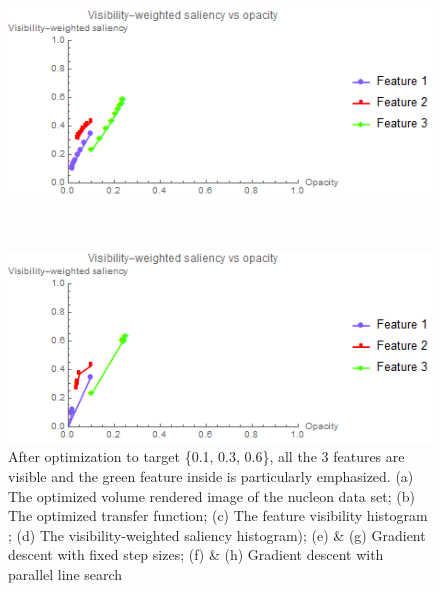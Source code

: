 \begin{figure}
	\begin{minipage}{.49\textwidth}
		\includegraphics[width=1\linewidth]{images/nucleon_naive_saliencyopacity_fixed}
		\subcaption{}
	\end{minipage}~
	\begin{minipage}{.49\textwidth}
		\includegraphics[width=1\linewidth]{images/nucleon_naive_saliencyopacity_parallelsearch}
		\subcaption{}
	\end{minipage}
	\caption[After optimization to target \{0.1, 0.3, 0.6\}, all the 3 features are visible and the green feature inside is particularly emphasized.]{After optimization to target \{0.1, 0.3, 0.6\}, all the 3 features are visible and the green feature inside is particularly emphasized. (a) The optimized volume rendered image of the nucleon data set; (b) The optimized transfer function; (c) The feature visibility histogram \cite{wang_efficient_2011}; (d) The visibility-weighted saliency histogram); (e) \& (g) Gradient descent with fixed step sizes; (f) \& (h) Gradient descent with parallel line search}
	\label{fig:nucleon_naive_optimized}
\end{figure}

